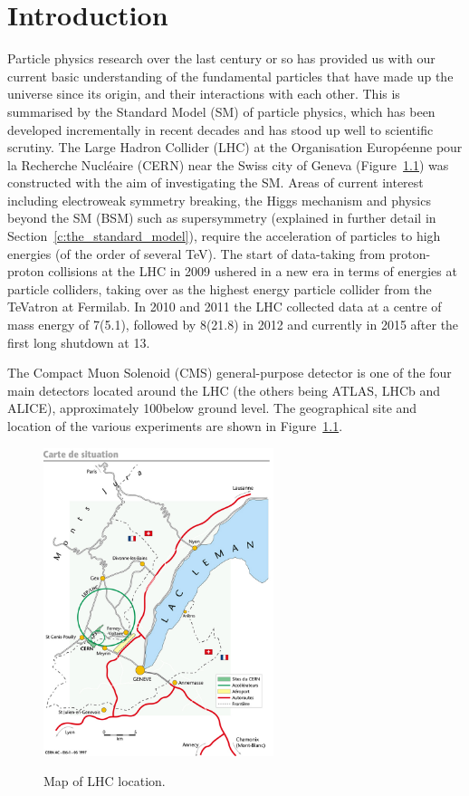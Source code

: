 \chapter{Introduction}
\label{c:introduction}
Particle physics research over the last century or so has provided us with our current basic understanding of
the fundamental particles that have made up the universe since its origin, and their interactions with each
other. This is summarised by the Standard Model (SM) of particle physics, which has been developed
incrementally in recent decades and has stood up well to scientific scrutiny. The Large Hadron Collider (LHC)
at the Organisation Europ\'{e}enne pour la Recherche Nucl\'{e}aire (CERN) near the Swiss city of Geneva
(Figure~\ref{fig:LHC_map}) was constructed with the aim of investigating the SM. Areas of current interest
including electroweak symmetry breaking, the Higgs mechanism and physics beyond the SM (BSM) such as
supersymmetry (explained in further detail in Section~\ref{c:the_standard_model}), require the acceleration of
particles to high energies (of the order of several TeV). The start of data-taking from proton-proton
collisions at the LHC in 2009 ushered in a new era in terms of energies at particle colliders, taking over as
the highest energy particle collider from the TeVatron at Fermilab. In 2010 and 2011 the LHC collected data at
a centre of mass energy of 7\TeV (5.1\fbinv), followed by 8\TeV (21.8\fbinv) in 2012 and currently in 2015
after the first long shutdown at 13\TeV.

The Compact Muon Solenoid (CMS) general-purpose detector is one of the four main detectors located around the
LHC (the others being ATLAS, LHCb and ALICE), approximately 100\m below ground level. The geographical site
and location of the various experiments are shown in Figure~\ref{fig:LHC_map}.

\begin{figure}[!hbtp]
   \centering
     \includegraphics[width=0.6\textwidth]{Chapters/01_Introduction/Images/lhc-pho-1997-169.jpg}\\
     \caption{Map of LHC location.}
     \label{fig:LHC_map}
\end{figure}

